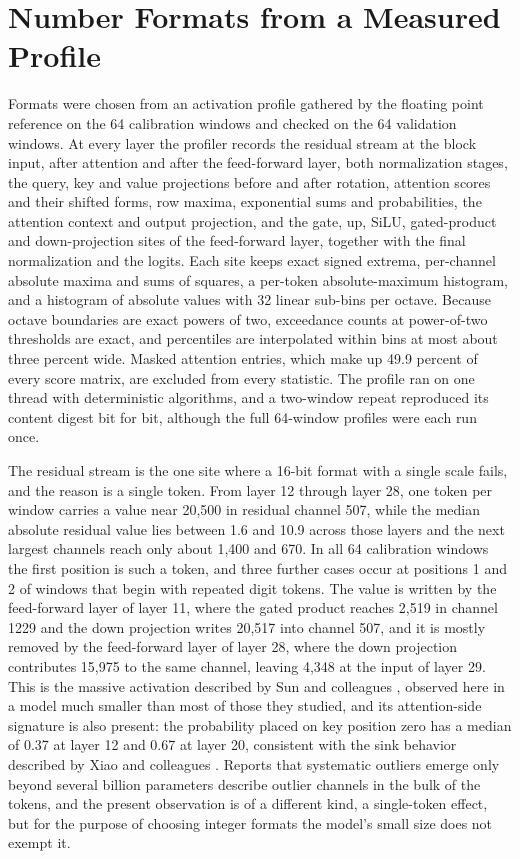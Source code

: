 \documentclass[11pt]{article}
\begin{document}
\section{Number Formats from a Measured Profile}
\label{sec:profile}

Formats were chosen from an activation profile gathered by the floating point reference on the 64 calibration windows and checked on the 64 validation windows. At every layer the profiler records the residual stream at the block input, after attention and after the feed-forward layer, both normalization stages, the query, key and value projections before and after rotation, attention scores and their shifted forms, row maxima, exponential sums and probabilities, the attention context and output projection, and the gate, up, SiLU, gated-product and down-projection sites of the feed-forward layer, together with the final normalization and the logits. Each site keeps exact signed extrema, per-channel absolute maxima and sums of squares, a per-token absolute-maximum histogram, and a histogram of absolute values with 32 linear sub-bins per octave. Because octave boundaries are exact powers of two, exceedance counts at power-of-two thresholds are exact, and percentiles are interpolated within bins at most about three percent wide. Masked attention entries, which make up 49.9 percent of every score matrix, are excluded from every statistic. The profile ran on one thread with deterministic algorithms, and a two-window repeat reproduced its content digest bit for bit, although the full 64-window profiles were each run once.

The residual stream is the one site where a 16-bit format with a single scale fails, and the reason is a single token. From layer 12 through layer 28, one token per window carries a value near 20,500 in residual channel 507, while the median absolute residual value lies between 1.6 and 10.9 across those layers and the next largest channels reach only about 1,400 and 670. In all 64 calibration windows the first position is such a token, and three further cases occur at positions 1 and 2 of windows that begin with repeated digit tokens. The value is written by the feed-forward layer of layer 11, where the gated product reaches 2,519 in channel 1229 and the down projection writes 20,517 into channel 507, and it is mostly removed by the feed-forward layer of layer 28, where the down projection contributes 15,975 to the same channel, leaving 4,348 at the input of layer 29. This is the massive activation described by Sun and colleagues \cite{sun2024}, observed here in a model much smaller than most of those they studied, and its attention-side signature is also present: the probability placed on key position zero has a median of 0.37 at layer 12 and 0.67 at layer 20, consistent with the sink behavior described by Xiao and colleagues \cite{xiao2024stream}. Reports that systematic outliers emerge only beyond several billion parameters \cite{xiao2023smooth} describe outlier channels in the bulk of the tokens, and the present observation is of a different kind, a single-token effect, but for the purpose of choosing integer formats the model's small size does not exempt it.
\end{document}
